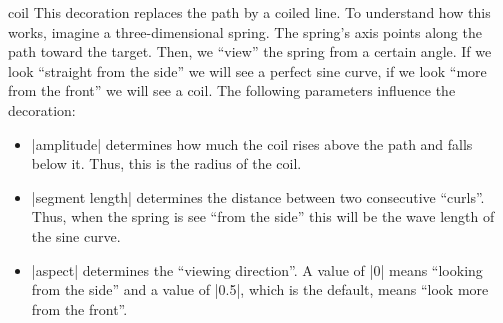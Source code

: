 \begin{decoration}{coil}
    This decoration replaces the path by a coiled line. To understand how this
    works, imagine a three-dimensional spring. The spring's axis points along
    the path toward the target. Then, we ``view'' the spring from a certain
    angle. If we look ``straight from the side'' we will see a perfect sine
    curve, if we look ``more from the front'' we will see a coil. The following
    parameters influence the decoration:
    \begin{itemize}
        \item |amplitude| determines how much the coil rises above the path and
            falls below it. Thus, this is the radius of the coil.
        \item |segment length| determines the distance between two consecutive
            ``curls''. Thus, when the spring is see ``from the side'' this will
            be the wave length of the sine curve.
        \item |aspect| determines the ``viewing direction''. A value of |0|
            means ``looking from the side'' and a value of |0.5|, which is the
            default, means ``look more from the front''.
    \end{itemize}
\begin{codeexample}[preamble={\usetikzlibrary{decorations.pathmorphing}}]
\end{codeexample}
\begin{codeexample}[preamble={\usetikzlibrary{decorations.pathmorphing}}]
\end{codeexample}
\end{decoration}

